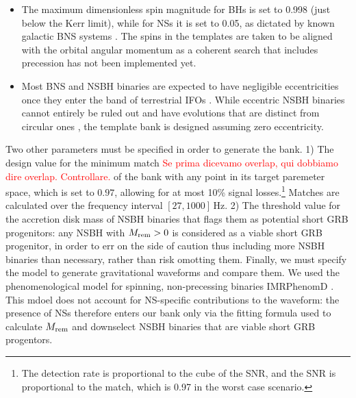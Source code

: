 \documentclass[binding=0.6cm, LaM]{sapthesis}
\newcommand{\fpg}[1]{\textcolor{red}{#1} }
\begin{document}
\begin{itemize}
        \item The maximum dimensionless spin magnitude for BHs is set to 0.998 (just below the Kerr limit), while for NSs it is set to 0.05, as dictated by known galactic BNS systems \cite{97}.  The spins in the templates are taken to be aligned with the orbital angular momentum as a coherent search that includes precession has not been implemented yet.
        \item Most BNS and NSBH binaries
        are expected to have negligible eccentricities once they enter the band of terrestrial IFOs \cite{86}.
        While eccentric NSBH binaries cannot entirely be ruled out
        and have evolutions that are distinct from circular ones \cite{71},
        the template bank is designed assuming zero eccentricity.
      \end{itemize}

      Two other parameters must be specified in order to generate the bank.  
	1) The design value for the minimum match \fpg{Se prima dicevamo overlap, qui dobbiamo dire overlap. Controllare.} of the bank with any point in its target paremeter space, which is set to $0.97$, allowing for at most 10\% signal losses.\footnote{The detection rate is proportional to the cube of the SNR, and the SNR is proportional to the match, which is 0.97 in the worst case scenario.}  Matches are calculated over the frequency interval $[27, 1000]\,$Hz. 2) The threshold value for the accretion disk mass of NSBH binaries that flags them as potential short GRB progenitors: any NSBH with $M_{\rm rem}>0$ is considered as a viable short GRB progenitor, in order to err on the side of caution thus including more NSBH binaries than necessary, rather than risk omotting them.
      Finally, we must specify the model to generate gravitational waveforms and compare them.  We used the phenomenological model for spinning, non-precessing binaries {\ttfamily IMRPhenomD} \cite{106}.  This mdoel does not account for NS-specific contributions to the waveform: the presence of NSs therefore enters our bank only via the fitting formula used to calculate $M_{\rm rem}$ and downselect NSBH binaries that are viable short GRB progentors.
\end{document}

